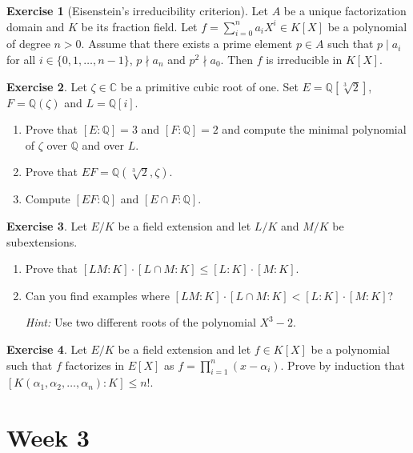 \documentclass[a4paper,10pt,reqno]{amsart}
\newcommand{\Q}{\mathbb{Q}}
\newcommand{\C}{\mathbb{C}}
\theoremstyle{definition} %
\newtheorem{ex}{Exercise}[section]
\begin{document}
\begin{ex} [Eisenstein's irreducibility criterion]
    Let $A$ be a unique factorization domain and $K$ be its fraction field.
    Let $f=\sum_{i=0}^n a_iX^i\in K[X]$ be a polynomial of degree $n>0$. 
    Assume that there exists a prime element $p\in A$ such that
    $p\mid a_i$ for all $i\in\{0,1,\dots,n-1\}$, $p\nmid a_n$ and
    $p^2\nmid a_0$. Then $f$ is irreducible in $K[X]$. 
\end{ex}


\begin{ex}
Let $\zeta\in\C$ be a primitive cubic root of one.
Set $E=\Q[\sqrt[3]{2}]$, $F=\Q(\zeta)$ and $L=\Q[i]$.
\begin{enumerate}[label=(\roman*)]
    \item Prove that $[E:\Q]=3$ and $[F:\Q]=2$ and compute the minimal polynomial of $\zeta$ over $\Q$ and over $L$.
    \item Prove that $EF=\Q(\sqrt[3]{2},\zeta)$.
    \item Compute $[EF:\Q]$ and $[E\cap F:\Q]$.
\end{enumerate}  
\end{ex}

\begin{ex}
    Let $E/K$ be a field extension and let $L/K$ and $M/K$ be subextensions.
    \begin{enumerate}[label=(\roman*)]
    \item Prove that $[LM : K ] \cdot [L \cap M : K] \leq [L:K] \cdot [M:K]$.
    \item Can you find examples where $[LM : K ] \cdot [L \cap M : K] < [L:K] \cdot [M:K]$?
    
    \noindent \textit{Hint:} Use two different roots of the polynomial $X^3 -2$.
    \end{enumerate}  
\end{ex}

\begin{ex}
    Let $E/K$ be a field extension and let $f \in K[X]$ be a polynomial such that $f$ factorizes in $E[X]$ as $f = \prod_{i=1}^n(x - \alpha_i)$. Prove by induction that $[K(\alpha_1,\alpha_2, \ldots, \alpha_n):K] \leq n!$.
\end{ex}
\section{Week 3}
\end{document}
